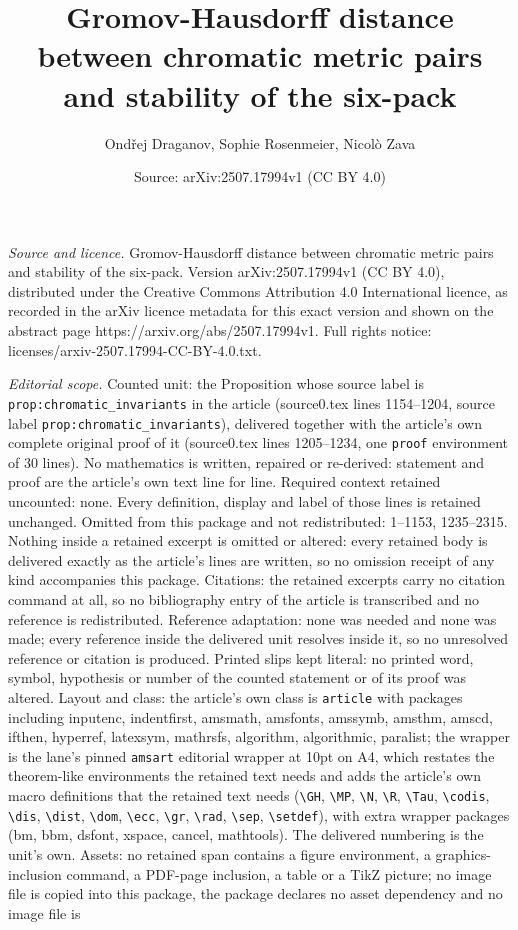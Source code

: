 \documentclass[10pt,a4paper]{amsart}
\title[Gromov-Hausdorff distance between chromatic metric pairs and]{Gromov-Hausdorff distance between chromatic metric pairs and stability of the six-pack}
\author{Ond\v{r}ej Draganov, Sophie Rosenmeier, Nicol\`o Zava}
\date{Source: arXiv:2507.17994v1 (CC BY 4.0)}
\begin{document}
\maketitle

\noindent\emph{Source and licence.} Gromov-Hausdorff distance between chromatic metric pairs and stability of the six-pack. Version arXiv:2507.17994v1 (CC BY 4.0), distributed under the Creative Commons Attribution 4.0 International licence, as recorded in the arXiv licence metadata for this exact version and shown on the abstract page https://arxiv.org/abs/2507.17994v1. Full rights notice: licenses/arxiv-2507.17994-CC-BY-4.0.txt.\par\smallskip

\noindent\textit{Editorial scope.} Counted unit: the Proposition whose source label is \texttt{prop:chromatic\_invariants} in the article (source0.tex lines 1154--1204, source label \texttt{prop:chromatic\_invariants}), delivered together with the article's own complete original proof of it (source0.tex lines 1205--1234, one \texttt{proof} environment of 30 lines). No mathematics is written, repaired or re-derived: statement and proof are the article's own text line for line. Required context retained uncounted: none. Every definition, display and label of those lines is retained unchanged. Omitted from this package and not redistributed: 1--1153, 1235--2315. Nothing inside a retained excerpt is omitted or altered: every retained body is delivered exactly as the article's lines are written, so no omission receipt of any kind accompanies this package. Citations: the retained excerpts carry no citation command at all, so no bibliography entry of the article is transcribed and no reference is redistributed. Reference adaptation: none was needed and none was made; every reference inside the delivered unit resolves inside it, so no unresolved reference or citation is produced. Printed slips kept literal: no printed word, symbol, hypothesis or number of the counted statement or of its proof was altered. Layout and class: the article's own class is \texttt{article} with packages including inputenc, indentfirst, amsmath, amsfonts, amssymb, amsthm, amscd, ifthen, hyperref, latexsym, mathrsfs, algorithm, algorithmic, paralist; the wrapper is the lane's pinned \texttt{amsart} editorial wrapper at 10pt on A4, which restates the theorem-like environments the retained text needs and adds the article's own macro definitions that the retained text needs (\texttt{\textbackslash GH}, \texttt{\textbackslash MP}, \texttt{\textbackslash N}, \texttt{\textbackslash R}, \texttt{\textbackslash Tau}, \texttt{\textbackslash codis}, \texttt{\textbackslash dis}, \texttt{\textbackslash dist}, \texttt{\textbackslash dom}, \texttt{\textbackslash ecc}, \texttt{\textbackslash gr}, \texttt{\textbackslash rad}, \texttt{\textbackslash sep}, \texttt{\textbackslash setdef}), with extra wrapper packages (bm, bbm, dsfont, xspace, cancel, mathtools). The delivered numbering is the unit's own. Assets: no retained span contains a figure environment, a graphics-inclusion command, a PDF-page inclusion, a table or a TikZ picture; no image file is copied into this package, the package declares no asset dependency and no image file is 
\end{document}
